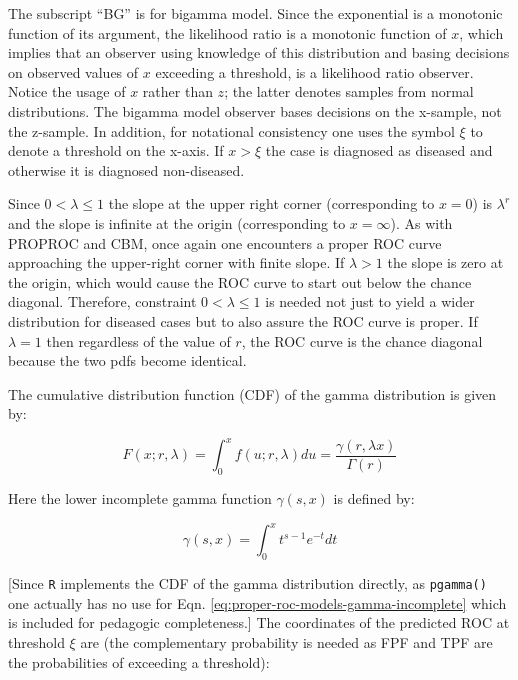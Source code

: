 \documentclass[
]{book}
\begin{document}
The subscript ``BG'' is for bigamma model. Since the exponential is a monotonic function of its argument, the likelihood ratio is a monotonic function of \(x\), which implies that an observer using knowledge of this distribution and basing decisions on observed values of \(x\) exceeding a threshold, is a likelihood ratio observer. Notice the usage of \(x\) rather than \(z\); the latter denotes samples from normal distributions. The bigamma model observer bases decisions on the x-sample, not the z-sample. In addition, for notational consistency one uses the symbol \(\xi\) to denote a threshold on the x-axis. If \(x > \xi\) the case is diagnosed as diseased and otherwise it is diagnosed non-diseased.

Since \(0 < \lambda \le 1\) the slope at the upper right corner (corresponding to \(x = 0\)) is \(\lambda ^ r\) and the slope is infinite at the origin (corresponding to \(x = \infty\)). As with PROPROC and CBM, once again one encounters a proper ROC curve approaching the upper-right corner with finite slope. If \(\lambda > 1\) the slope is zero at the origin, which would cause the ROC curve to start out below the chance diagonal. Therefore, constraint \(0 < \lambda \le 1\) is needed not just to yield a wider distribution for diseased cases but to also assure the ROC curve is proper. If \(\lambda = 1\) then regardless of the value of \(r\), the ROC curve is the chance diagonal because the two pdfs become identical.

The cumulative distribution function (CDF) of the gamma distribution is given by:

\begin{equation}
F\left( x;r,\lambda \right) = \int_{0}^{x}f\left( u;r,\lambda \right) du
= \frac{\gamma\left( r, \lambda x \right)}{\Gamma\left( r \right)}
\label{eq:proper-roc-models-gamma-cdf}
\end{equation}

Here the lower incomplete gamma function \citep{abramowitz1964handbook} \(\gamma\left( s,x \right)\) is defined by:

\begin{equation}
\gamma\left( s,x \right) = \int_{0}^{x} t^{s-1} e^{-t} dt
\label{eq:proper-roc-models-gamma-incomplete}
\end{equation}

{[}Since \texttt{R} implements the CDF of the gamma distribution directly, as \texttt{pgamma()} one actually has no use for Eqn. \eqref{eq:proper-roc-models-gamma-incomplete} which is included for pedagogic completeness.{]} The coordinates of the predicted ROC at threshold \(\xi\) are (the complementary probability is needed as FPF and TPF are the probabilities of exceeding a threshold):
\end{document}
